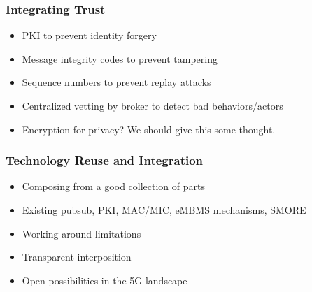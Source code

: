 {\subsubsection{Integrating Trust}

\begin{itemize}
\item PKI to prevent identity forgery
\item Message integrity codes to prevent tampering
\item Sequence numbers to prevent replay attacks
\item Centralized vetting by broker to detect bad behaviors/actors
\item Encryption for privacy? We should give this some thought.
\end{itemize}

\subsubsection{Technology Reuse and Integration}

\begin{itemize}
\item Composing from a good collection of parts
\item Existing pubsub, PKI, MAC/MIC, eMBMS mechanisms, SMORE
\item Working around limitations
\item Transparent interposition
\item Open possibilities in the 5G landscape
\end{itemize}
}
